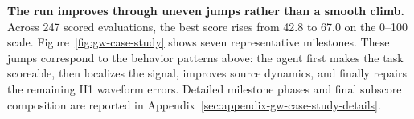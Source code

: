\textbf{The run improves through uneven jumps rather than a smooth climb.} Across 247 scored evaluations, the best score rises from 42.8 to 67.0 on the 0--100 scale. Figure~\ref{fig:gw-case-study} shows seven representative milestones. These jumps correspond to the behavior patterns above: the agent first makes the task scoreable, then localizes the signal, improves source dynamics, and finally repairs the remaining H1 waveform errors. Detailed milestone phases and final subscore composition are reported in Appendix~\ref{sec:appendix-gw-case-study-details}.
